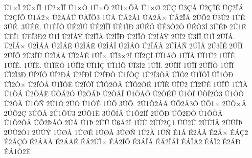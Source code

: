 {^^da1^^d7^^cf
2^^da^^d7^^cf^^cc
1^^da2^^d7^^cf^^ce
^^da1^^d7^^d2
1^^da^^d7^^d5
2^^da1^^d7^^d5^^c0
^^da1^^d7^^d8
2^^da^^c7
^^da3^^c7^^c1
^^da2^^c7^^cc^^c9
^^da^^c72^^ce^^c1
^^da2^^c7^^ce^^d5
^^da1^^c42^^d7
^^da2^^c4^^c5^^db
^^da^^c4^^cf^^d63
1^^da^^c5
^^da^^c52^^c21
^^da^^c52^^c5^^d7
^^da^^c52^^cf^^c4
2^^da^^d62
^^da3^^da2
1^^da^^c9
3^^da^^c9.
3^^da^^c9^^ca.
^^da1^^c9^^ce^^d4
^^da^^c92^^cf^^da
^^da^^c92^^cf^^ce^^cf
^^da^^c91^^cf^^d0
3^^da^^c9^^d3
^^da^^c93^^d42^^d2
^^da^^c9^^d53^^cd
3^^da^^c9^^de
2^^da1^^cb
^^da^^cb^^cf1
^^da^^cb^^cf3^^d02
^^da1^^cc
^^da2^^cc^^c1^^dd
^^da2^^cc^^cf^^c2
^^da2^^cc^^cf^^d0
^^da2^^cc^^cf^^d2
^^da2^^cc^^c0^^dd
2^^da^^cd2
^^da3^^cd^^ce
^^da1^^ce
2^^da^^ce^^c1.
^^da2^^ce^^c1^^d7
^^da2^^ce^^c1^^c5
^^da2^^ce^^c1^^ca
^^da2^^ce^^c1^^cb
^^da2^^ce^^c1^^ce
^^da2^^ce^^c1^^d4
^^da2^^ce^^c1^^c0
2^^da^^ce^^c1^^d1
2^^da^^ce^^c5
2^^da3^^ce^^c9
2^^da^^ce^^cf
2^^da^^ce^^d5
2^^da3^^ce^^d9
^^da2^^cf^^c2^^c5
^^da^^cf2^^c2^^c9
1^^da^^cf^^d7
^^da^^cf3^^d72^^cd
^^da^^cf2^^c7^^cc
^^da^^cf1^^c4^^d2
1^^da^^cf^^c5
^^da^^cf1^^da2
1^^da^^cf^^c9
1^^da^^cf^^ca.
1^^da^^cf^^cb.
^^da1^^cf^^cb^^d3
1^^da^^cf^^cc2
^^da^^cf1^^cc^^c7
^^da^^cf1^^cc^^d6
^^da^^cf3^^cd2
1^^da^^cf^^cd.
2^^da^^cf^^cd^^ce
1^^da^^cf^^ce
2^^da^^cf^^ce^^d2
1^^da^^cf^^cf
^^da^^cf2^^cf3^^d0
^^da^^cf2^^cf^^d3
^^da^^cf2^^d0^^c1
^^da2^^cf^^d0^^cc
^^da2^^cf^^d0^^d2
^^da1^^cf^^d2^^c7
1^^da2^^cf3^^d2^^c5
^^da^^cf^^d32
^^da1^^cf^^d3^^ce
^^da^^cf1^^d3^^d0
^^da^^cf2^^d4^^d7
^^da2^^cf^^d4^^c5
^^da1^^cf^^d4^^cb
^^da2^^cf^^d4^^cf
^^da^^cf^^d42^^d2^^c5
^^da^^cf^^d42^^d2^^c9
1^^da^^cf^^c8
^^da^^cf^^db2
^^da^^cf2^^db^^c9
1^^da^^cf^^dc
1^^da^^cf^^c0
^^da1^^d2^^c1
^^da2^^d2^^c1^^cb
^^da^^d2^^c12^^d3
^^da2^^d2^^c1^^de
^^da2^^d2^^c5^^ce
^^da1^^d2^^c5^^d3
^^da2^^d2^^c9^^db
^^da1^^d2^^cf
^^da^^d2^^cf2^^d33
^^da1^^d2^^d5
^^da2^^d2^^c0
^^da1^^d2^^d1
2^^da1^^d3
2^^da^^d4
^^da1^^d4^^c9
1^^da^^d5
3^^da^^d5.
2^^da1^^d52^^c2^^c5
^^da^^d52^^c23^^d2
^^da^^d51^^d7
2^^da^^d5^^d7^^c5
2^^da^^d52^^c7
3^^da^^d5^^c5
2^^da1^^d5^^da3
2^^da^^d51^^cb
3^^da^^d5^^cd^^c5
^^da1^^d52^^cd^^cf
2^^da^^d5^^d0
^^da^^d52^^d0^^d2
^^da1^^d5^^d2^^c2
^^da1^^d52^^d4^^c5
^^da^^d52^^de^^c1^^d3
2^^da^^c3
^^da1^^de
2^^da^^db
^^da^^df^^c52^^cd
1^^da^^d9
2^^da^^d92^^c71
^^da^^d92^^da
2^^da^^d9^^cd^^c5
2^^da^^d9^^cd^^de
2^^da^^d92^^d31
2^^da^^d9^^dd
1^^da^^d8^^c5
1^^da^^d8^^c9
1^^da^^d8^^c0
3^^da^^d8^^d1
1^^da2^^c0
1^^da^^d1
^^c91^^c1
^^c92^^c1^^c2
^^c92^^c1^^d7
^^c9^^c1^^c72
^^c92^^c1^^c7^^d2
^^c92^^c1^^c4^^c5
^^c92^^c1^^c4^^c9
^^c9^^c12^^da^^cf^^d7
^^c9^^c12^^cd^^d5
^^c93^^c1^^ce^^c1
^^c9^^c12^^ce^^c1^^cc
^^c9^^c1^^ce^^c42
^^c9^^c1^^cf2
^^c92^^c1^^d0
^^c9^^c11^^d32^^cb
}
